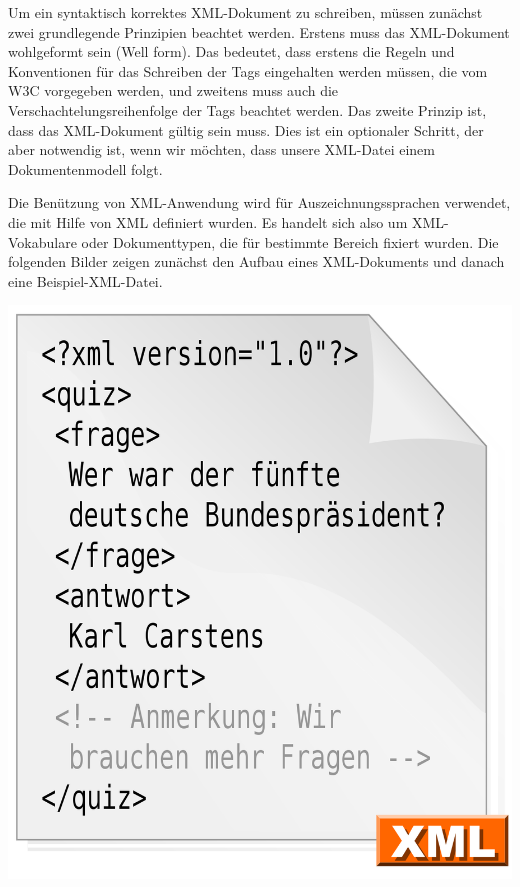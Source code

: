 Um ein syntaktisch korrektes XML-Dokument zu schreiben, müssen zunächst zwei grundlegende Prinzipien beachtet werden. Erstens muss das XML-Dokument wohlgeformt sein (Well form). Das bedeutet, dass erstens die Regeln und Konventionen für das Schreiben der Tags eingehalten werden müssen, die vom W3C vorgegeben werden, und zweitens muss auch die Verschachtelungsreihenfolge der Tags beachtet werden. Das zweite Prinzip ist, dass das XML-Dokument gültig sein muss. Dies ist ein optionaler Schritt, der aber notwendig ist, wenn wir möchten, dass unsere XML-Datei einem Dokumentenmodell folgt.

Die Benützung von XML-Anwendung wird für Auszeichnungssprachen verwendet, die mit Hilfe von XML definiert wurden. Es handelt sich also um XML-Vokabulare oder Dokumenttypen, die für bestimmte Bereich fixiert wurden.\cite{helmut36}
Die folgenden Bilder zeigen zunächst den Aufbau eines XML-Dokuments und danach eine Beispiel-XML-Datei.

\begin{center}

\includegraphics[scale=.3]{./images/Xml_datei_Beispiel}
\end{center}

